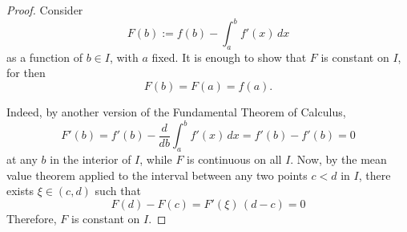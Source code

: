 

\begin{proof}

Consider
$$
F(b) := f(b) - \int_a^b f'(x)\,dx 
$$
as a function of $b\in I$, with $a$ fixed. It is enough to 
show that $F$ is constant on $I$, for then 
$$
F(b) = F(a) = f(a).
$$

Indeed, by another version of the Fundamental Theorem of Calculus,
$$
F'(b) = f'(b) - \frac{d}{db}\int_a^b f'(x)\, dx = f'(b) - f'(b) = 0
$$
at any $b$ in the interior of $I$, while $F$ is continuous on all $I$. 
Now, by the mean value theorem applied to the interval between any 
two points $c<d$ in $I$, there exists $\xi\in (c,d)$ such that
$$
F(d) - F(c) = F'(\xi)\, (d-c) = 0
$$
Therefore, $F$ is constant on $I$.

\end{proof}

